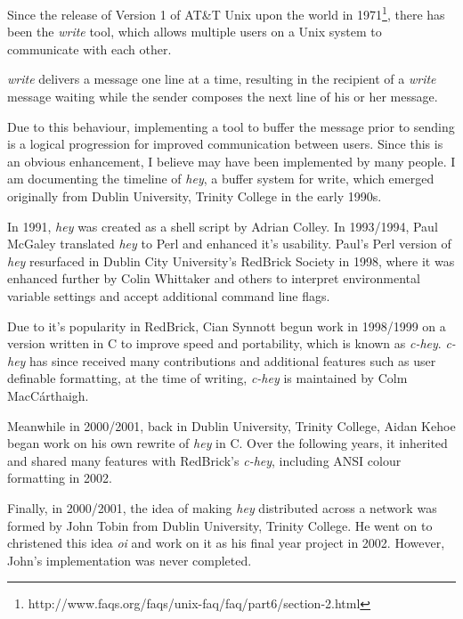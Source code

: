 Since the release of Version 1 of AT\&T Unix upon the world 
in 1971\footnote{http://www.faqs.org/faqs/unix-faq/faq/part6/section-2.html}, 
there has been the \emph{write} tool, which allows multiple users on a Unix 
system to communicate with each other.


\emph{write} delivers a message one line at a time,
resulting in the recipient of a \emph{write} message waiting while the
sender composes the next line of his or her message.


Due to this behaviour, implementing a tool to buffer the message
prior to sending is a logical progression for improved communication
between users. Since this is an obvious enhancement, I believe 
may have been implemented by many people. I am documenting the 
timeline of \emph{hey}, a buffer system for write, which emerged 
originally from Dublin University, Trinity College in the early 1990s.


In 1991, \emph{hey} was created as a shell script by Adrian Colley. In 
1993/1994, Paul McGaley translated \emph{hey} to Perl and enhanced it's 
usability. Paul's Perl version of \emph{hey} resurfaced in Dublin City 
University's RedBrick Society in 1998, where it was enhanced further by
Colin Whittaker and others to interpret environmental variable settings 
and accept additional command line flags.


Due to it's popularity in RedBrick, Cian Synnott begun work in 1998/1999
on a version written in C to improve speed and portability, which is 
known as \emph{c-hey}. \emph{c-hey} has since received many 
contributions and additional features such as user definable formatting,
at the time of writing, \emph{c-hey} is maintained by Colm 
MacC\'{a}rthaigh.


Meanwhile in 2000/2001, back in Dublin University, Trinity College, Aidan 
Kehoe began work on his own rewrite of \emph{hey} in C. Over the 
following years, it inherited and shared many features with RedBrick's 
\emph{c-hey}, including ANSI colour formatting in 2002.


Finally, in 2000/2001, the idea of making \emph{hey} distributed across 
a network was formed by John Tobin from Dublin University, Trinity 
College.  He went on to christened this idea \emph{oi} and work on it 
as his final year project in 2002. However, John's implementation was
never completed.
